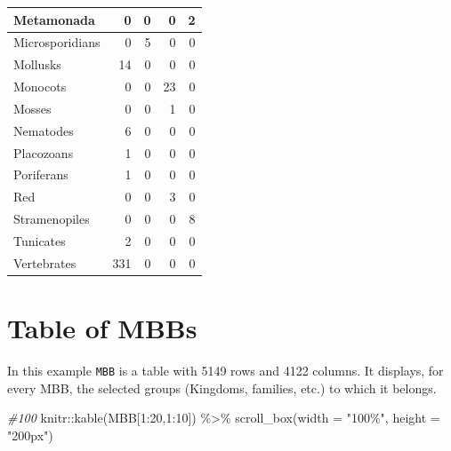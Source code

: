 \documentclass[
  letterpaper,
  DIV=11,
  numbers=noendperiod]{scrreprt}
\newenvironment{Shaded}{}{}
\newcommand{\AttributeTok}[1]{\textcolor[rgb]{0.78,0.47,0.87}{#1}}
\newcommand{\CommentTok}[1]{\textcolor[rgb]{0.36,0.39,0.44}{\textit{#1}}}
\newcommand{\DecValTok}[1]{\textcolor[rgb]{0.82,0.60,0.40}{#1}}
\newcommand{\FunctionTok}[1]{\textcolor[rgb]{0.38,0.69,0.94}{#1}}
\newcommand{\NormalTok}[1]{\textcolor[rgb]{0.67,0.70,0.75}{#1}}
\newcommand{\SpecialCharTok}[1]{\textcolor[rgb]{0.34,0.71,0.76}{#1}}
\newcommand{\StringTok}[1]{\textcolor[rgb]{0.60,0.76,0.47}{#1}}
\begin{document}
\begin{tabular}{l|r|r|r|r}
\hline
Metamonada & 0 & 0 & 0 & 2\\
\hline
Microsporidians & 0 & 5 & 0 & 0\\
\hline
Mollusks & 14 & 0 & 0 & 0\\
\hline
Monocots & 0 & 0 & 23 & 0\\
\hline
Mosses & 0 & 0 & 1 & 0\\
\hline
Nematodes & 6 & 0 & 0 & 0\\
\hline
Placozoans & 1 & 0 & 0 & 0\\
\hline
Poriferans & 1 & 0 & 0 & 0\\
\hline
Red & 0 & 0 & 3 & 0\\
\hline
Stramenopiles & 0 & 0 & 0 & 8\\
\hline
Tunicates & 2 & 0 & 0 & 0\\
\hline
Vertebrates & 331 & 0 & 0 & 0\\
\hline
\end{tabular}

\hypertarget{table-of-mbbs}{%
\section{Table of MBBs}\label{table-of-mbbs}}

In this example \texttt{MBB} is a table with 5149 rows and 4122 columns.
It displays, for every MBB, the selected groups (Kingdoms, families,
etc.) to which it belongs.

\begin{Shaded}
\begin{Highlighting}[]
\CommentTok{\#100}
\NormalTok{knitr}\SpecialCharTok{::}\FunctionTok{kable}\NormalTok{(MBB[}\DecValTok{1}\SpecialCharTok{:}\DecValTok{20}\NormalTok{,}\DecValTok{1}\SpecialCharTok{:}\DecValTok{10}\NormalTok{]) }\SpecialCharTok{\%\textgreater{}\%}   
  \FunctionTok{scroll\_box}\NormalTok{(}\AttributeTok{width =} \StringTok{"100\%"}\NormalTok{, }\AttributeTok{height =} \StringTok{"200px"}\NormalTok{)}
\end{Highlighting}
\end{Shaded}
\end{document}
